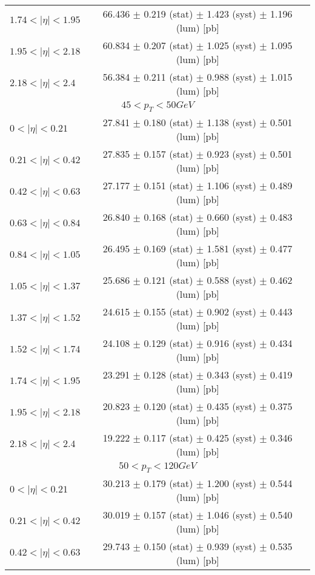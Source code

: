 \begin{tabular}{lc}
$1.74 < |\eta| <1.95$          & 66.436 $\pm$ 0.219 (stat) $\pm$ 1.423 (syst) $\pm$ 1.196 (lum) [pb]  \\
$1.95 < |\eta| <2.18$          & 60.834 $\pm$ 0.207 (stat) $\pm$ 1.025 (syst) $\pm$ 1.095 (lum) [pb]  \\
$2.18 < |\eta| <2.4$           & 56.384 $\pm$ 0.211 (stat) $\pm$ 0.988 (syst) $\pm$ 1.015 (lum) [pb]  \\
\hline
\multicolumn{2}{c}{$45 < p_{T} < 50 GeV$} \\
\hline
$0 < |\eta| <0.21$             & 27.841 $\pm$ 0.180 (stat) $\pm$ 1.138 (syst) $\pm$ 0.501 (lum) [pb]  \\
$0.21 < |\eta| <0.42$          & 27.835 $\pm$ 0.157 (stat) $\pm$ 0.923 (syst) $\pm$ 0.501 (lum) [pb]  \\
$0.42 < |\eta| <0.63$          & 27.177 $\pm$ 0.151 (stat) $\pm$ 1.106 (syst) $\pm$ 0.489 (lum) [pb]  \\
$0.63 < |\eta| <0.84$          & 26.840 $\pm$ 0.168 (stat) $\pm$ 0.660 (syst) $\pm$ 0.483 (lum) [pb]  \\
$0.84 < |\eta| <1.05$          & 26.495 $\pm$ 0.169 (stat) $\pm$ 1.581 (syst) $\pm$ 0.477 (lum) [pb]  \\
$1.05 < |\eta| <1.37$          & 25.686 $\pm$ 0.121 (stat) $\pm$ 0.588 (syst) $\pm$ 0.462 (lum) [pb]  \\
$1.37 < |\eta| <1.52$          & 24.615 $\pm$ 0.155 (stat) $\pm$ 0.902 (syst) $\pm$ 0.443 (lum) [pb]  \\
$1.52 < |\eta| <1.74$          & 24.108 $\pm$ 0.129 (stat) $\pm$ 0.916 (syst) $\pm$ 0.434 (lum) [pb]  \\
$1.74 < |\eta| <1.95$          & 23.291 $\pm$ 0.128 (stat) $\pm$ 0.343 (syst) $\pm$ 0.419 (lum) [pb]  \\
$1.95 < |\eta| <2.18$          & 20.823 $\pm$ 0.120 (stat) $\pm$ 0.435 (syst) $\pm$ 0.375 (lum) [pb]  \\
$2.18 < |\eta| <2.4$           & 19.222 $\pm$ 0.117 (stat) $\pm$ 0.425 (syst) $\pm$ 0.346 (lum) [pb]  \\
\hline
\multicolumn{2}{c}{$50 < p_{T} < 120 GeV$} \\
\hline
$0 < |\eta| <0.21$             & 30.213 $\pm$ 0.179 (stat) $\pm$ 1.200 (syst) $\pm$ 0.544 (lum) [pb]  \\
$0.21 < |\eta| <0.42$          & 30.019 $\pm$ 0.157 (stat) $\pm$ 1.046 (syst) $\pm$ 0.540 (lum) [pb]  \\
$0.42 < |\eta| <0.63$          & 29.743 $\pm$ 0.150 (stat) $\pm$ 0.939 (syst) $\pm$ 0.535 (lum) [pb]  \\

\end{tabular}
